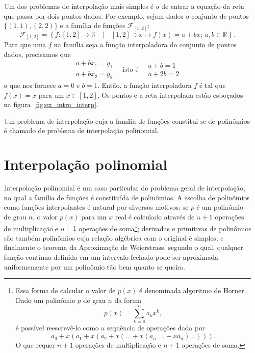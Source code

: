 \begin{ex}\label{ex:intro_interpolacao}
  Um dos problemas de interpolação mais simples é o de entrar a equação da reta que passa por dois pontos dados. Por exemplo, sejam dados o conjunto de pontos $\{(1, 1), (2, 2)\}$ e a família de funções $\mathcal{F}_{[1,2]}$:
  \begin{equation*}
   \mathcal{F}_{[1,2]} = \left\{f:[1,2]\rightarrow \mathbb{R}\quad|\quad[1,2]\ni x\mapsto f(x) = a + bx;\,a,b\in\mathbb{R}\right\}.
  \end{equation*}
  Para que uma $f$ na família seja a função interpoladora do conjunto de pontos dados, precisamos que
  \begin{equation*}
    \begin{array}{l}
      a + bx_1 = y_1\\
      a + bx_2 = y_2
    \end{array}\quad\text{isto é}\quad
    \begin{array}{l}
      a + b = 1\\
      a + 2b = 2
    \end{array}
  \end{equation*}
o que nos fornece $a = 0$ e $b = 1$. Então, a função interpoladora $f$ é tal que  $f(x) = x$ para um $x\in[1,2]$. Os pontos e a reta interpolada estão esboçados na figura~\ref{fig:ex_intro_interp}.
\end{ex}

Um problema de interpolação cuja a família de funções constitui-se de polinômios é chamado de problema de interpolação polinomial.

\section{Interpolação polinomial}

Interpolação polinomial é um caso particular do problema geral de interpolação, no qual a família de funções é constituída de polinômios. A escolha de polinômios como funções interpolantes é natural por diversos  motivos: se $p$ é um polinômio de grau $n$, o valor $p(x)$ para um $x$ real é calculado através de $n+1$ operações de multiplicação e $n+1$ operações de soma\footnote{Essa forma de calcular o valor de $p(x)$ é denominada algoritmo de Horner. Dado um polinômio $p$ de grau $n$ da forma \begin{equation*}p(x)=\sum_{k=0}^{n}a_k x^k,\end{equation*} é possível reescrevê-lo como a sequência de operações dada por \begin{equation*}a_0 + x\left(a_1 + x\left(a_2 + x\left(\ldots + x\left(a_{n-1} + x a_n\right)\ldots\right)\right)\right).\end{equation*} O que requer $n+1$ operações de multiplicação e $n+1$ operações de soma.}; derivadas e primitivas de polinômios são também polinômios cuja relação algébrica com o original é simples; e finalmente o teorema da Aproximação de Weierstrass, segundo o qual, qualquer função contínua definida em um intervalo fechado pode ser aproximada uniformemente por um polinômio tão bem quanto se queira.  

